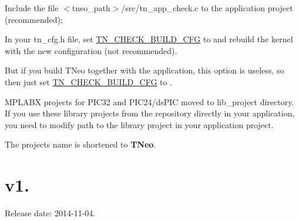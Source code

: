 \begin{DoxyItemize}
\begin{DoxyItemize}
\item Include the file {\ttfamily $<$tneo\+\_\+path$>$/src/tn\+\_\+app\+\_\+check.c} to the application project (recommended);
\item In your {\ttfamily tn\+\_\+cfg.\+h} file, set {\ttfamily \hyperlink{tn__cfg__default_8h_aacdc913eb66492cf69cf02a5de73578e}{T\+N\+\_\+\+C\+H\+E\+C\+K\+\_\+\+B\+U\+I\+L\+D\+\_\+\+C\+FG}} to {} and rebuild the kernel with the new configuration (not recommended).
\end{DoxyItemize}

But if you build T\+Neo together with the application, this option is useless, so then just set {\ttfamily \hyperlink{tn__cfg__default_8h_aacdc913eb66492cf69cf02a5de73578e}{T\+N\+\_\+\+C\+H\+E\+C\+K\+\_\+\+B\+U\+I\+L\+D\+\_\+\+C\+FG}} to {}.
\item M\+P\+L\+A\+BX projects for P\+I\+C32 and P\+I\+C24/ds\+P\+IC moved to {\ttfamily lib\+\_\+project} directory. If you use these library projects from the repository directly in your application, you need to modify path to the library project in your application project.
\item The project\textquotesingle{}s name is shortened to {\bfseries T\+Neo}.
\end{DoxyItemize}\hypertarget{changelog_changelog_v1_04}{}\section{v1.}\label{changelog_changelog_v1_04}
Release date\+: 2014-\/11-\/04.


